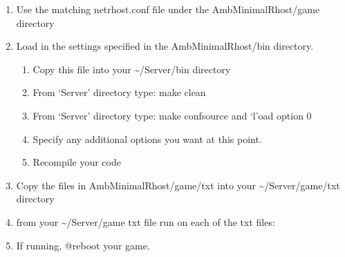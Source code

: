 \documentclass[letterpaper,10pt,english]{sphinxmanual}
\begin{document}
\begin{enumerate}
%
\item {} 
\sphinxAtStartPar
Use the matching netrhost.conf file under the Amb\sphinxhyphen{}MinimalRhost/game directory

\item {} 
\sphinxAtStartPar
Load in the settings specified in the Amb\sphinxhyphen{}MinimalRhost/bin directory.
\begin{enumerate}
%
\item {} 
\sphinxAtStartPar
Copy this file into your \textasciitilde{}/Server/bin directory

\item {} 
\sphinxAtStartPar
From ‘Server’ directory type: make clean

\item {} 
\sphinxAtStartPar
From ‘Server’ directory type: make confsource and ‘l’oad option 0

\item {} 
\sphinxAtStartPar
Specify any \sphinxhyphen{}additional\sphinxhyphen{} options you want at this point.

\item {} 
\sphinxAtStartPar
Recompile your code

\end{enumerate}

\item {} 
\sphinxAtStartPar
Copy the files in Amb\sphinxhyphen{}MinimalRhost/game/txt into your \textasciitilde{}/Server/game/txt directory

\item {} 
\sphinxAtStartPar
from your \textasciitilde{}/Server/game txt file run on each of the txt files:

\begin{sphinxVerbatim}[commandchars=\\\{\}]
  
           
\end{sphinxVerbatim}

\item {} 
\sphinxAtStartPar
If running, @reboot your game.

\end{enumerate}
\end{document}

